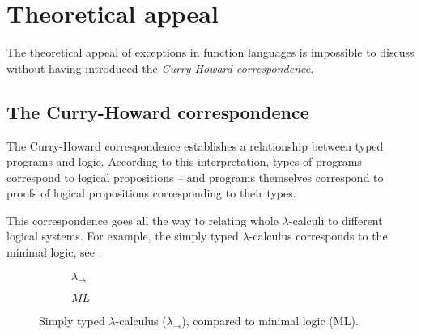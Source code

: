 
\section{Theoretical appeal}

The theoretical appeal of exceptions in function languages is impossible to discuss
without having introduced the \emph{Curry-Howard correspondence}.

\subsection{The Curry-Howard correspondence}

The Curry-Howard correspondence establishes a relationship between typed programs and logic.
According to this interpretation, types of programs correspond to logical propositions --
and programs themselves correspond to proofs of logical propositions corresponding to their
types.

This correspondence goes all the way to relating whole $\lambda$-calculi to different
logical systems. For example, the simply typed $\lambda$-calculus corresponds to the minimal
logic, see .

\begin{figure}
\centering
\begin{subfigure}[b]{0.45\textwidth}
\begin{prooftree}
\end{prooftree}
\begin{prooftree}
\end{prooftree}
\begin{prooftree}
\end{prooftree}

\caption{$\lambda_\to$}
\end{subfigure}
%
\begin{subfigure}[b]{0.45\textwidth}
\begin{prooftree}
\end{prooftree}
\begin{prooftree}
\end{prooftree}
\begin{prooftree}
\end{prooftree}
\caption{$ML$}
\end{subfigure}

\caption{Simply typed $\lambda$-calculus ($\lambda_\to$), compared to minimal logic (ML).}
\label{fig:stlc-ml}
\end{figure}

